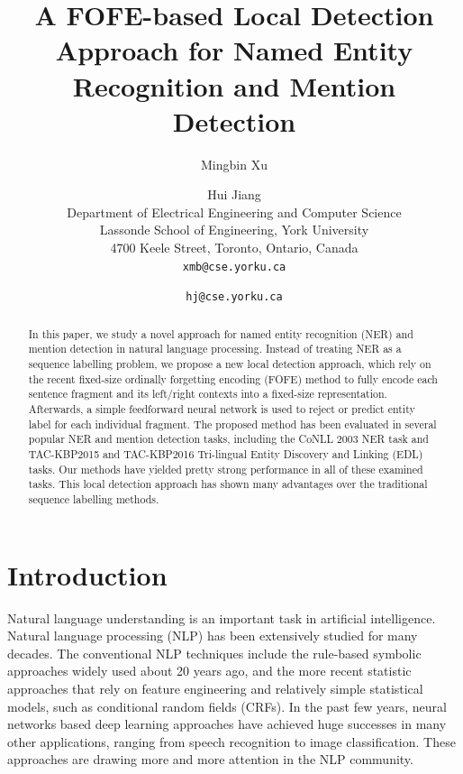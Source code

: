 \documentclass[11pt,a4paper]{article}
\title{A FOFE-based Local Detection Approach for Named Entity Recognition and Mention Detection}
\author{Mingbin Xu \and Hui Jiang \\
	Department of Electrical Engineering and Computer Science \\
	Lassonde School of Engineering, York University \\
	4700 Keele Street, Toronto, Ontario, Canada\\
	{\tt xmb@cse.yorku.ca} \and  {\tt hj@cse.yorku.ca}  
}
\date{}
\begin{document}
\maketitle

\begin{abstract}
	In this paper, we study a novel approach for named entity recognition (NER) and mention detection in natural language processing. Instead of treating NER as a sequence labelling problem, we propose a new local detection approach, which rely on the recent fixed-size ordinally forgetting encoding (FOFE) method to fully encode each sentence fragment and its left/right contexts into a fixed-size representation. Afterwards, a simple feedforward neural network is used to reject or predict entity label for each individual fragment. The proposed method has been evaluated in several popular NER and mention detection tasks, including the CoNLL 2003 NER task and  TAC-KBP2015 and TAC-KBP2016 Tri-lingual Entity Discovery and Linking (EDL) tasks. Our methods have yielded pretty strong performance in all of these examined tasks. This local detection approach has shown many advantages over the traditional sequence labelling  methods.
\end{abstract}


\section{Introduction}

Natural language understanding is an important task in artificial intelligence. Natural language processing (NLP) has been extensively studied for many decades. The conventional NLP techniques include the rule-based symbolic approaches widely used about 20 years ago, and the more recent statistic approaches that rely on feature engineering and relatively simple statistical models, such as conditional random fields (CRFs). In the past few years, neural networks based deep learning approaches have achieved huge successes in many other applications, ranging from speech recognition to image classification. These approaches are drawing more and more attention in the NLP community. 
\end{document}
